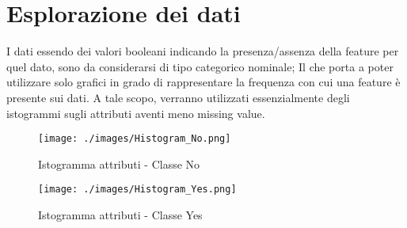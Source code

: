 \section{Esplorazione dei dati}
I dati essendo dei valori booleani indicando la presenza/assenza della feature per quel dato, sono da considerarsi di tipo categorico nominale; Il che porta a poter utilizzare solo grafici in grado di rappresentare la frequenza con cui una feature è presente sui dati. A tale scopo, verranno utilizzati essenzialmente degli istogrammi sugli attributi aventi meno missing value.

\begin{figure}[hbtp]
 	\centering
 	\texttt{[image: ./images/Histogram\_No.png]}
 	\caption{Istogramma attributi - Classe No}
 	\label{NoHist}
\end{figure}

\begin{figure}[hbtp]
	\centering
	\texttt{[image: ./images/Histogram\_Yes.png]}
	\caption{Istogramma attributi - Classe Yes}
	\label{YesHist}
\end{figure}